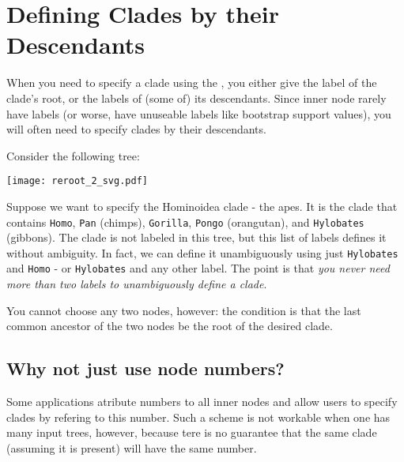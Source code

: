 \chapter{Defining Clades by their Descendants}
\label{sct_def_clades}

When you need to specify a clade using the \nutils{}, you either give the label
of the clade's root, or the labels of (some of) its descendants. Since inner
node rarely have labels (or worse, have unuseable labels like bootstrap support
		values), you will often need to specify clades by their
descendants.

Consider the following tree:

\begin{center}
\texttt{[image: reroot\_2\_svg.pdf]} 
\end{center}

Suppose we want to specify the Hominoidea clade - the apes. It is the clade
that contains \texttt{Homo}, \texttt{Pan} (chimps), \texttt{Gorilla},
     \texttt{Pongo} (orangutan), and \texttt{Hylobates} (gibbons). The clade is
     not labeled in this tree, but this list of labels defines it without
     ambiguity. In fact, we can define it unambiguously using just
     \texttt{Hylobates} and \texttt{Homo} - or \texttt{Hylobates} and any other
     label. The point is that \emph{you never need more than two labels to
     unambiguously define a clade}.

You cannot choose any two nodes, however: the condition is that the last
common ancestor of the two nodes be the root of the desired clade.

\section{Why not just use node numbers?}

Some applications atribute numbers to all inner nodes and allow users to specify clades by refering to this number. Such a scheme is not workable when one has many input trees, however, because tere is no guarantee that the same clade (assuming it is present) will have the same number.
